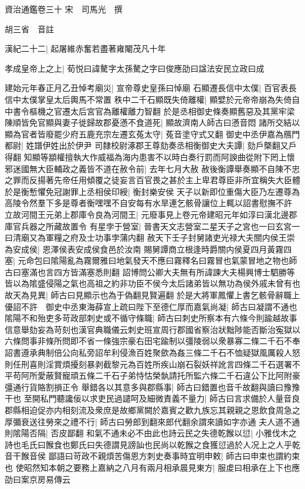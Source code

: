 資治通鑑卷三十
宋　司馬光　撰

胡三省　音註

漢紀二十二|{
	起屠維赤奮若盡著雍閹茂凡十年}


孝成皇帝上之上|{
	荀悦曰諱驁字太孫驁之字曰俊應劭曰諡法安民立政曰成}


建始元年春正月乙丑悼考廟災|{
	宣帝尊史皇孫曰悼廟}
石顯遷長信中太僕|{
	百官表長信中太僕掌皇太后輿馬不常置}
秩中二千石顯既失倚離權|{
	顯嬖於元帝帝崩為失倚自中書令樞機之官遷太后宮官為離權離力智翻}
於是丞相御史條奏顯舊惡及其黨牢梁陳順皆免官顯與妻子徙歸故郡憂懣不食道死|{
	顯故濟南人師古曰懣音悶}
諸所交結以顯為官者皆廢罷少府五鹿充宗左遷玄菟太守|{
	菟音塗守式又翻}
御史中丞伊嘉為鴈門都尉|{
	姓譜伊姓出於伊尹}
司隸校尉涿郡王尊劾奏丞相衡御史大夫譚|{
	劾戶槩翻又戶得翻}
知顯等顓權擅執大作威福為海内患害不以時白奏行罰而阿諛曲從附下罔上懷邪迷國無大臣輔政之義皆不道在赦令前|{
	去年七月大赦}
赦後衡譚舉奏顯不自陳不忠之罪而反揚著先帝任用傾覆之徒妄言百官畏之甚於主上卑君尊臣非所宜稱失大臣體於是衡慙懼免冠謝罪上丞相侯印綬|{
	衡封樂安侯}
天子以新即位重傷大臣乃左遷尊為高陵令然羣下多是尊者衡嘿嘿不自安每有水旱連乞骸骨讓位上輒以詔書慰撫不許　立故河間王元弟上郡庫令良為河間王|{
	元廢事見上卷元帝建昭元年如淳曰漢北邊郡庫官兵器之所藏故置令}
有星孛于營室|{
	晉書天文志營室二星天子之宮也一曰玄宮一曰清廟又為軍糧之府及士功事孛蒲内翻}
赦天下壬子封舅諸吏光禄大夫關内侯王崇為安成侯|{
	恩澤侯表安成侯食邑於汝南}
賜舅譚商立根逢時爵關内侯夏四月黃霧四塞|{
	元命包曰隂陽亂為霧爾雅曰地氣發天不應曰霧釋名曰霧冒也氣蒙冒地之物也師古曰塞滿也言四方皆滿塞悉則翻}
詔博問公卿大夫無有所諱諫大夫楊興博士駟勝等皆以為隂盛侵陽之氣也高祖之約非功臣不侯今太后諸弟皆以無功為侯外戚未曾有也故天為見異|{
	師古曰見顯示也為于偽翻見賢遍翻}
於是大將軍鳳懼上書乞骸骨辭職上優詔不許　御史中丞東海薛宣上疏曰陛下至德仁厚而嘉氣尚凝|{
	師古曰凝謂不通也}
隂陽不和殆吏多苛政部刺史或不循守條職|{
	師古曰刺史所察本有六條今則踰越故事信意舉劾妄為苛刻也漢官典職儀云刺史班宣周行郡國省察治狀黜陟能否斷治寃獄以六條問事非條所問即不省一條強宗豪右田宅踰制以彊陵弱以衆暴寡二條二千石不奉詔書遵承典制倍公向私旁詔牟利侵漁百姓聚歛為姦三條二千石不恤疑獄風厲殺人怒則任刑喜則淫賞煩擾刻暴剥截黎元為百姓所疾山崩石裂妖祥訛言四條二千石選署不平苟阿所愛蔽賢寵頑五條二千石子弟恃怙榮埶請托所監六條二千石違公下比阿附豪彊通行貨賂割損正令}
舉錯各以其意多與郡縣事|{
	師古曰錯置也音千故翻與讀曰豫豫干也}
至開私門聽讒佞以求吏民過譴呵及細微責義不量力|{
	師古曰言求備於人量音良}
郡縣相迫促亦内相刻流及衆庶是故鄉黨闕於嘉賓之歡九族忘其親親之恩飲食周急之厚彌衰送往勞來之禮不行|{
	師古曰勞郎到翻來郎代翻余謂來讀如字亦通}
夫人道不通則隂陽否隔|{
	否皮鄙翻}
和氣不通未必不由此也詩云民之失德乾餱以愆|{
	小雅伐木之詩也毛氏曰餱食也鄭氏曰失德謂見謗訕也民尚以乾餱之食獲愆過於人况上之人乎乾音干餱音侯}
鄙語曰苛政不親煩苦傷恩方刺史奏事時宜明申敕|{
	師古曰申束也謂約束也}
使昭然知本朝之要務上嘉納之八月有兩月相承晨見東方|{
	服䖍曰相承在上下也應劭曰案京房易傳云}


